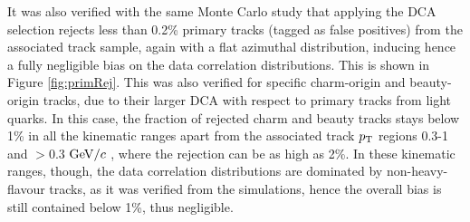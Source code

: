It was also verified with the same Monte Carlo study that applying the DCA selection rejects less than 0.2\% primary tracks (tagged as false positives) from the associated track sample, again with a flat azimuthal distribution, inducing hence a fully negligible bias on the data correlation distributions. This is shown in Figure \ref{fig:primRej}. This was also verified for specific charm-origin and beauty-origin tracks, due to their larger DCA with respect to primary tracks from light quarks. In this case, the fraction of rejected charm and beauty tracks stays below 1\% in all the kinematic ranges apart from the associated track $p_{\rm T}$ regions 0.3-1 and $>0.3$ $\mathrm{GeV}/c$ , where the rejection can be as high as 2\%. In these kinematic ranges, though, the data correlation distributions are dominated by non-heavy-flavour tracks, as it was verified from the simulations, hence the overall bias is still contained below 1\%, thus negligible.

